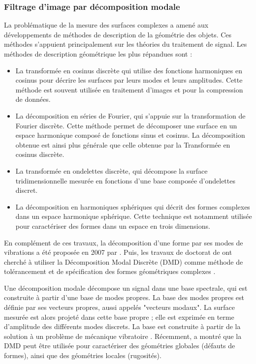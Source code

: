 \subsubsection{Filtrage d'image par décomposition modale} \label{subsubsec:dmd}
La problématique de la mesure des surfaces complexes a amené aux développements de méthodes de description de la géométrie des objets.
Ces méthodes s'appuient principalement sur les théories du traitement de signal.
Les méthodes de description géométrique les plus répandues sont :
\begin{itemize}
	\item La transformée en cosinus discrète qui utilise des fonctions harmoniques en cosinus pour décrire les surfaces par leurs modes et leurs amplitudes. Cette méthode est souvent utilisée en traitement d'images et pour la compression de données.
	\item La décomposition en séries de Fourier, qui s'appuie sur la transformation de Fourier discrète. Cette méthode permet de décomposer une surface en un espace harmonique composé de fonctions sinus et cosinus. La décomposition obtenue est ainsi plus générale que celle obtenue par la Transformée en cosinus discrète.
	\item La transformée en ondelettes discrète, qui décompose la surface tridimensionnelle mesurée en fonctions d'une base composée d'ondelettes discret.
	\item La décomposition en harmoniques sphériques qui décrit des formes complexes dans un espace harmonique sphérique. Cette technique est notamment utilisée pour caractériser des formes dans un espace en trois dimensions.
\end{itemize}

En complément de ces travaux, la décomposition d'une forme par ses modes de vibrations a été proposée en 2007 par \citeauthor{samper_form_2007} \cite{samper_form_2007}.
Puis, les travaux de doctorat de \citeauthor{adragna_tolerancement_2007, favreliere_modal_2009} \cite{adragna_tolerancement_2007, favreliere_modal_2009} ont cherché à utiliser la Décomposition Modal Discrète (DMD) comme méthode de tolérancement et de spécification des formes géométriques complexes \cite{favreliere_modal_2009}.

Une décomposition modale décompose un signal dans une base spectrale, qui est construite à partir d'une base de modes propres.
La base des modes propres est définie par ses vecteurs propres, aussi appelés "vecteurs modaux".
La surface mesurée est alors projeté dans cette base propre ; elle est exprimée en terme d'amplitude des différents modes discrets.
La base est construite à partir de la solution à un problème de mécanique vibratoire \cite{goic_multiscale_2016}.
Récemment, \citeauthor{goic_multi_2011} \cite{goic_multi_2011} a montré que la DMD peut être utilisée pour caractériser des géométries globales (défauts de formes), ainsi que des géométries locales (rugosités).


